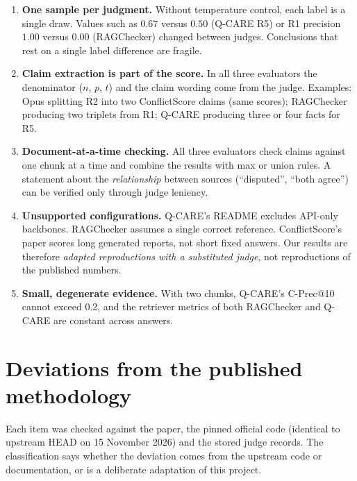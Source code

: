 \documentclass[11pt,a4paper]{article}
\begin{document}
\begin{enumerate}
\item \textbf{One sample per judgment.} Without temperature control, each label is a single draw. Values such as $0.67$ versus $0.50$ (Q-CARE R5) or R1 precision $1.00$ versus $0.00$ (RAGChecker) changed between judges. Conclusions that rest on a single label difference are fragile.
\item \textbf{Claim extraction is part of the score.} In all three evaluators the denominator ($n$, $p$, $t$) and the claim wording come from the judge. Examples: Opus splitting R2 into two ConflictScore claims (same scores); RAGChecker producing two triplets from R1; Q-CARE producing three or four facts for R5.
\item \textbf{Document-at-a-time checking.} All three evaluators check claims against one chunk at a time and combine the results with max or union rules. A statement about the \emph{relationship} between sources (``disputed'', ``both agree'') can be verified only through judge leniency.
\item \textbf{Unsupported configurations.} Q-CARE's README excludes API-only backbones. RAGChecker assumes a single correct reference. ConflictScore's paper scores long generated reports, not short fixed answers. Our results are therefore \emph{adapted reproductions with a substituted judge}, not reproductions of the published numbers.
\item \textbf{Small, degenerate evidence.} With two chunks, Q-CARE's C-Prec@10 cannot exceed 0.2, and the retriever metrics of both RAGChecker and Q-CARE are constant across answers.
\end{enumerate}

\section{Deviations from the published methodology}
\label{sec:disc}

Each item was checked against the paper, the pinned official code (identical to upstream HEAD on 15 November 2026) and the stored judge records. The classification says whether the deviation comes from the upstream code or documentation, or is a deliberate adaptation of this project.
\end{document}
